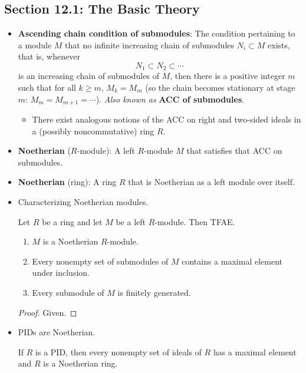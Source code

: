 \documentclass[../notes.tex]{subfiles}
\begin{document}
\subsection*{Section 12.1: The Basic Theory}
\begin{itemize}
    \item \textbf{Ascending chain condition of submodules}: The condition pertaining to a module $M$ that no infinite increasing chain of submodules $N_i\subset M$ exists, that is, whenever
    \begin{equation*}
        N_1 \subset N_2 \subset \cdots
    \end{equation*}
    is an increasing chain of submodules of $M$, then there is a positive integer $m$ such that for all $k\geq m$, $M_k=M_m$ (so the chain becomes stationary at stage $m$: $M_m=M_{m+1}=\cdots$). \emph{Also known as} \textbf{ACC of submodules}.
    \begin{itemize}
        \item There exist analogous notions of the ACC on right and two-sided ideals in a (possibly noncommutative) ring $R$.
    \end{itemize}
    \item \textbf{Noetherian} ($R$-module): A left $R$-module $M$ that satisfies that ACC on submodules.
    \item \textbf{Noetherian} (ring): A ring $R$ that is Noetherian as a left module over itself.
    \item Characterizing Noetherian modules.
    \begin{theorem}\label{trm:12.1}
        Let $R$ be a ring and let $M$ be a left $R$-module. Then TFAE.
        \begin{enumerate}
            \item $M$ is a Noetherian $R$-module.
            \item Every nonempty set of submodules of $M$ contains a maximal element under inclusion.
            \item Every submodule of $M$ is finitely generated.
        \end{enumerate}
        \begin{proof}
            Given.
        \end{proof}
    \end{theorem}
    \item PIDs are Noetherian.
    \begin{corollary}\label{cly:12.2}
        If $R$ is a PID, then every nonempty set of ideals of $R$ has a maximal element and $R$ is a Noetherian ring.

\end{corollary}
\end{itemize}
\end{document}
